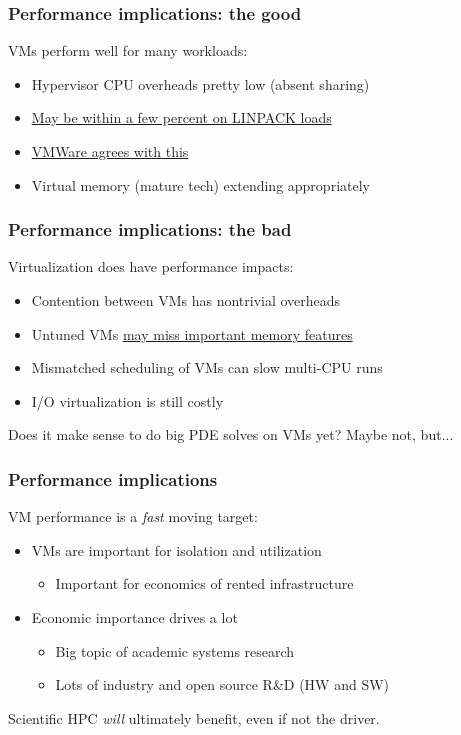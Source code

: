 \documentclass{beamer}
\begin{document}
\begin{frame}
  \frametitle{Performance implications: the good}

  VMs perform well for many workloads:
  \begin{itemize}
  \item Hypervisor CPU overheads pretty low (absent sharing)
  \item
    \href{http://h20195.www2.hpe.com/V2/getpdf.aspx/4AA6-2761ENW.pdf}{May
      be within a few percent on LINPACK loads}
  \item
    \href{http://blogs.vmware.com/performance/tag/linpack}{VMWare
      agrees with this}
  \item Virtual memory (mature tech) extending appropriately
  \end{itemize}
\end{frame}


\begin{frame}
  \frametitle{Performance implications: the bad}

  Virtualization does have performance impacts:
  \begin{itemize}
  \item Contention between VMs has nontrivial overheads
  \item Untuned VMs
    \href{http://blog.pierreroudier.net/wp-content/uploads/2015/08/rc25482.pdf}{may
      miss important memory features}
  \item Mismatched scheduling of VMs can slow multi-CPU runs
  \item I/O virtualization is still costly
  \end{itemize}
  Does it make sense to do big PDE solves on VMs yet?  Maybe not, but...
\end{frame}


\begin{frame}
  \frametitle{Performance implications}

  VM performance is a {\em fast} moving target:
  \begin{itemize}
  \item VMs are important for isolation and utilization
    \begin{itemize}
    \item Important for economics of rented infrastructure
    \end{itemize}
  \item Economic importance drives a lot
    \begin{itemize}
    \item Big topic of academic systems research
    \item Lots of industry and open source R\&D (HW and SW)
    \end{itemize}
  \end{itemize}
  Scientific HPC {\em will} ultimately benefit, even if not the driver.
\end{frame}
\end{document}
